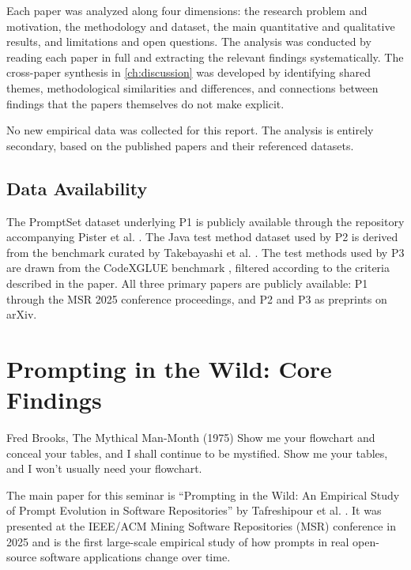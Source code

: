 \documentclass[
    pdftex,
    final,
    11pt,
    a4paper,
    parskip=false,
    oneside,
    footheight=0mm,
    footinclude=false,
    toc=bibliography
]{scrbook}
\begin{document}
Each paper was analyzed along four dimensions: the research problem and motivation, the methodology and dataset, the main quantitative and qualitative results, and limitations and open questions. The analysis was conducted by reading each paper in full and extracting the relevant findings systematically. The cross-paper synthesis in \autoref{ch:discussion} was developed by identifying shared themes, methodological similarities and differences, and connections between findings that the papers themselves do not make explicit.

No new empirical data was collected for this report. The analysis is entirely secondary, based on the published papers and their referenced datasets.

\section{Data Availability}

The PromptSet dataset underlying P1 is publicly available through the repository accompanying Pister et al. \cite{Pister2024}. The Java test method dataset used by P2 is derived from the benchmark curated by Takebayashi et al. \cite{Takebayashi2023}. The test methods used by P3 are drawn from the CodeXGLUE benchmark \cite{Lu2021}, filtered according to the criteria described in the paper. All three primary papers are publicly available: P1 through the MSR 2025 conference proceedings, and P2 and P3 as preprints on arXiv.


\chapter{Prompting in the Wild: Core Findings}
\label{ch:core}

\begin{chapter-quotation}{Fred Brooks, The Mythical Man-Month (1975)}
Show me your flowchart and conceal your tables, and I shall continue to be mystified. Show me your tables, and I won't usually need your flowchart.
\end{chapter-quotation}

The main paper for this seminar is ``Prompting in the Wild: An Empirical Study of Prompt Evolution in Software Repositories'' by Tafreshipour et al. \cite{Tafreshipour2025}. It was presented at the IEEE/ACM Mining Software Repositories (MSR) conference in 2025 and is the first large-scale empirical study of how prompts in real open-source software applications change over time.
\end{document}
